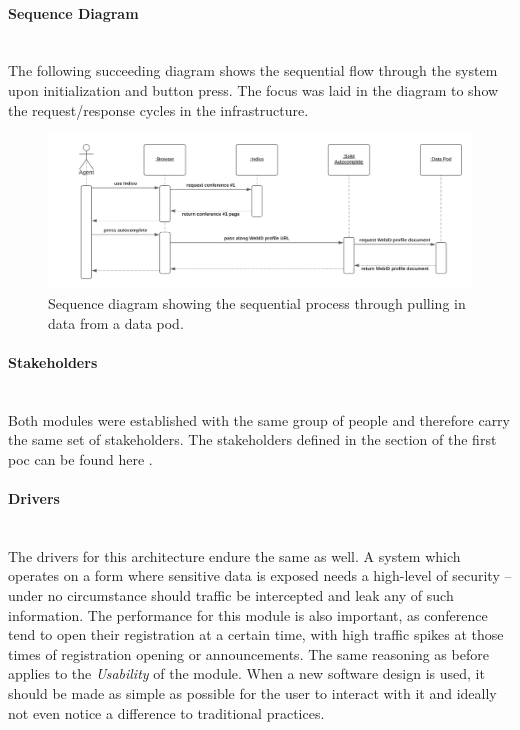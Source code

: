\paragraph{Sequence Diagram}\mbox{}\\

The following succeeding diagram shows the sequential flow through the system upon initialization and button press. The focus was laid in the diagram to show the request/response cycles in the infrastructure. 

\begin{figure}[H]
    \centering
    \includegraphics[width=\textwidth]{prototype/graphs/poc-conference_registration-autocomplete-sequence_diagram.png}
    \caption{Sequence diagram showing the sequential process through pulling in data from a data pod.}
    \label{fig:poc-conference_registration-autocomplete-sequence_diagram}
\end{figure}

\vspace{0.5cm}
\paragraph{Stakeholders}\mbox{}\\

Both modules were established with the same group of people and therefore carry the same set of stakeholders. The stakeholders defined in the section of the first \gls{poc} can be found here \cite{poc1-stakeholders}.
\vspace{0.5cm}
\paragraph{Drivers}\mbox{}\\

The drivers for this architecture endure the same as well. A system which operates on a form where sensitive data is exposed needs a high-level of security -- under no circumstance should traffic be intercepted and leak any of such information. The performance for this module is also important, as conference tend to open their registration at a certain time, with high traffic spikes at those times of registration opening or announcements. The same reasoning as before applies to the \textit{Usability} of the module. When a new software design is used, it should be made as simple as possible for the user to interact with it and ideally not even notice a difference to traditional practices.

